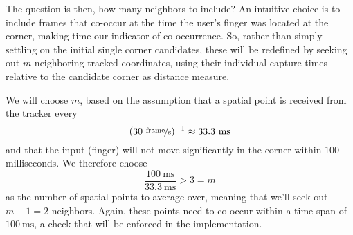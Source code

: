 The question is then, how many neighbors to include? An intuitive choice is to include frames that co-occur at the time the user's finger was located at the corner, making time our indicator of co-occurrence.  So, rather than simply settling on the initial single corner candidates,  these will be redefined by seeking out  $m$ neighboring tracked coordinates, using their individual capture times relative to the candidate corner as distance measure. 

We will choose $m$, based on the assumption that a spatial point is received from the tracker every 
$$ (30\  \nicefrac{\text{frame}}{\text{s} })^{-1} \approx 33.3 \ \text{ms}$$ 
and that the input (finger) will not move significantly in the corner within $100 $ milliseconds. We therefore choose 
$$\frac{100 \ \text{ms}}{33.3 \ \text{ms}} > 3  = m $$
as the number of spatial points to average over, meaning that we'll seek out $m-1=2$ neighbors. Again, these points need to co-occur within a time span of $100 \ \text{ms}$, a check that will be enforced in the implementation. 

